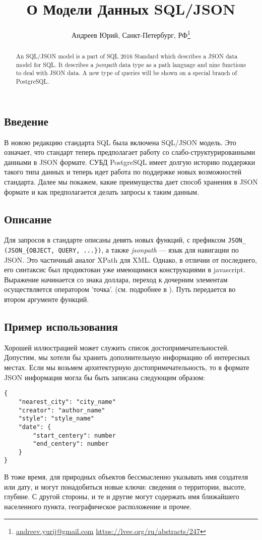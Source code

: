 \documentclass[10pt, a5paper]{article}
\begin{document}
\title{О Модели Данных SQL/JSON}
\author{Андреев Юрий, Санкт-Петербург, РФ\footnote{\url{andreev.yurij@gmail.com} \url{https://lvee.org/ru/abstracts/247}}}
\maketitle
\begin{abstract}
An SQL/JSON model is a part of SQL 2016 Standard\cite{AY1} which describes a JSON data model for SQL.
It describes a \textit{jsonpath} data type as a path language and nine functions to deal with JSON data.
A new type of queries will be shown on a special branch of PostgreSQL.
\end{abstract}

\subsection*{Введение}
В новою редакцию стандарта SQL\cite{AY1} была включена SQL/JSON модель.
Это означает, что стандарт теперь предполагает работу со слабо-структурированными
данными в JSON формате\cite{AY2}. СУБД PostgreSQL имеет долгую историю поддержки такого типа данных
и теперь идет работа по поддержке новых возможностей \linebreak стандарта\cite{AY4}.
Далее мы покажем, какие преимущества дает способ хранения в JSON формате и как 
предполагается делать запросы к таким данным.

\subsection*{Описание}
Для запросов в стандарте описаны девять новых функций, с префиксом 
\texttt{JSON\_ (JSON\_\{OBJECT, QUERY, ...\})},
а также \textit{jsonpath} --- язык для навигации по JSON. Это частичный аналог XPath для XML. 
Однако, в отличии от последнего, его синтаксис был продиктован уже имеющимися конструкциями в javascript. 
Выражение начинается со знака доллара, переход к дочерним элементам осуществляется оператором 'точка'.
(см. подробнее в \cite{AY3}). Путь передается во втором аргументе функций. 

\subsection*{Пример использования}
Хорошей иллюстрацией может служить список достопримечательностей. 
Допустим, мы хотели бы хранить дополнительную информацию об интересных местах. 
Если мы возьмем архитектурную достопримечательность, 
то в формате JSON информация могла бы быть записана следующим образом:
\begin{verbatim}
{
    "nearest_city": "city_name"
    "creator": "author_name"
    "style": "style_name"
    "date": {
        "start_centery": number
        "end_centery": number
    }
}
\end{verbatim}
В тоже время, для природных объектов бессмысленно указывать имя создателя или дату,
и могут понадобиться новые ключи: сведения о территории, высоте, глубине. 
С другой стороны, и те и другие могут содержать имя ближайшего населенного пункта, 
географическое расположение и прочее. 
\end{document}
